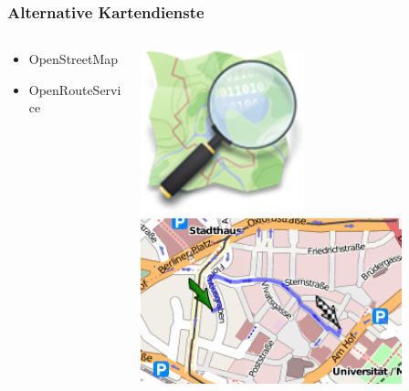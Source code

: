 \documentclass[12pt]{beamer}
\begin{document}
\begin{frame}
    \frametitle{Alternative Kartendienste}
    \begin{columns}
        \begin{column}{5cm}
            \begin{center}
                    \begin{itemize}
                            \item OpenStreetMap
                            \vspace{2cm}
                            \item OpenRouteService
                    \end{itemize}
            \end{center}
        \end{column}
        \begin{column}{5cm}
            \begin{center}
                \includegraphics[width=0.5\textwidth]{img/osm.png}
                \vspace{1cm}
                \includegraphics[width=0.8\textwidth]{img/openrouteservice.png}
            \end{center}
        \end{column}
    \end{columns}
\end{frame}
\end{document}
